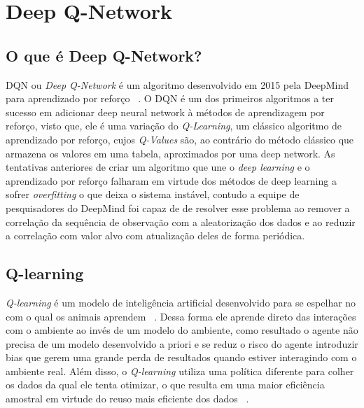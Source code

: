 

\chapter{Deep Q-Network}
\label{cap:dqn}

\section{O que é Deep Q-Network?}
\label{sec:o-que-e-dqn}

\enlargethispage{.5\baselineskip}
DQN ou \textit{Deep Q-Network} é um algoritmo desenvolvido em 2015 pela DeepMind para aprendizado por reforço ~\citep{Human-level-control}. O DQN é um dos primeiros algoritmos a ter sucesso em adicionar deep neural network à métodos de aprendizagem por reforço, visto que, ele é uma variação do \textit{Q-Learning}, um clássico algoritmo de aprendizado por reforço, cujos \textit{Q-Values} são, ao contrário do método clássico que armazena os valores em uma tabela, aproximados por uma deep network. As tentativas anteriores de criar um algoritmo que une o \textit{deep learning} e o aprendizado por reforço falharam em virtude dos métodos de deep learning a sofrer \textit{overfitting} o que deixa o sistema instável, contudo a equipe de pesquisadores do DeepMind foi capaz de de resolver esse problema ao remover a correlação da sequência de observação com a aleatorização dos dados e ao reduzir a correlação com valor alvo com atualização deles de forma periódica.

\section{Q-learning}
\label{sec:q-learning}

\enlargethispage{.5\baselineskip}

\textit{Q-learning} é um modelo de inteligência artificial desenvolvido para se espelhar no com o qual os animais aprendem ~\citep{Watkins:PhD}. Dessa forma ele aprende direto das interações com o ambiente ao invés de um modelo do ambiente, como resultado o agente não precisa de um modelo desenvolvido a priori e se reduz o risco do agente introduzir bias que gerem uma grande perda de resultados quando estiver interagindo com o ambiente real. Além disso, o \textit{Q-learning} utiliza uma política diferente para colher os dados da qual ele tenta otimizar, o que resulta em uma maior eficiência amostral em virtude do reuso mais eficiente dos dados ~\citep{Nguyen_La_2019}.


